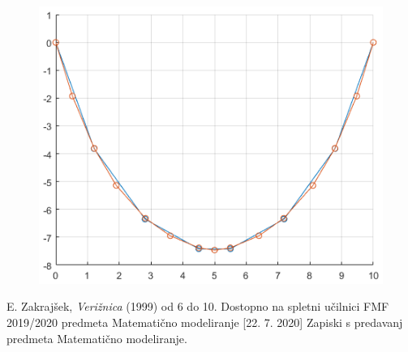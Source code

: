 \documentclass[A4paper, 11pt]{article}
\begin{document}
\begin{figure}[h]
\centering
\includegraphics[scale=0.8]{liha_in_soda_3}
\end{figure}



\begin{thebibliography}{9}
	E. Zakrajšek, \emph{Verižnica} (1999) od 6 do 10.
	Dostopno na spletni učilnici FMF 2019/2020 predmeta Matematično modeliranje [22. 7. 2020]
	Zapiski s predavanj predmeta Matematično modeliranje.
\end{thebibliography}
\end{document}
